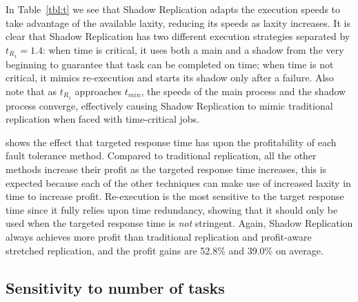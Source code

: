 In Table~\ref{tbl:t} we see that Shadow Replication adapts the execution
speeds to take advantage of the available laxity, reducing its speeds
as laxity increases. It is clear that Shadow Replication has two different execution strategies separated by $t_{R_1}=1.4$: when time is critical, it uses both a main and a shadow from the very beginning to guarantee that task can be completed on time; when time is not critical, it mimics re-execution and starts its shadow only after a failure.
Also note that as $t_{R_1}$
approaches $t_{min}$, the speeds of the main process and the shadow process
converge, effectively causing Shadow Replication to mimic traditional
replication when faced with time-critical jobs.

 shows the effect that targeted response time has upon
the profitability of each fault tolerance method. Compared to traditional replication, all the other methods increase their profit as the targeted
response time increases, this is expected because each of the other
techniques can make use of increased laxity in time to increase
profit. Re-execution is the most sensitive to the target response
time since it fully relies upon time redundancy, showing that it should only be used when the targeted response time is \emph{not} stringent. 
Again, Shadow Replication always achieves more profit than traditional
replication and profit-aware stretched replication, and the profit
gains are 52.8\% and 39.0\% on average. 

\subsection{Sensitivity to number of tasks}


